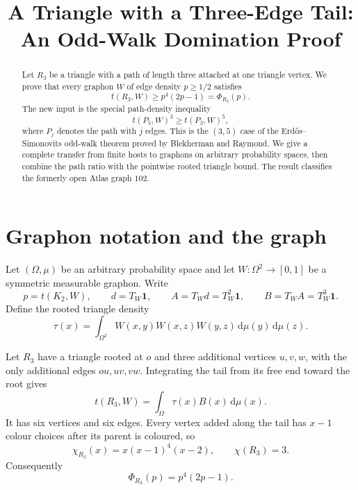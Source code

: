 \documentclass[11pt]{article}
\title{A Triangle with a Three-Edge Tail:\\
An Odd-Walk Domination Proof}
\author{}
\date{}
\newcommand{\dd}{\,\mathrm d}
\begin{document}
\maketitle

\begin{abstract}
Let $R_3$ be a triangle with a path of length three attached at one triangle
vertex.  We prove that every graphon $W$ of edge density $p\geq1/2$ satisfies
\[
 t(R_3,W)\geq p^4(2p-1)=\Phi_{R_3}(p).
\]
The new input is the special path-density inequality
\[
 t(P_5,W)^3\geq t(P_3,W)^5,
\]
where $P_j$ denotes the path with $j$ edges.  This is the $(3,5)$ case of
the Erd\H{o}s--Simonovits odd-walk theorem proved by Blekherman and Raymond.
We give a complete transfer from finite hosts to graphons on arbitrary
probability spaces, then combine the path ratio with the pointwise rooted
triangle bound.  The result classifies the formerly open Atlas graph $102$.
\end{abstract}


\section{Graphon notation and the graph}

Let $(\Omega,\mu)$ be an arbitrary probability space and let
$W\colon\Omega^2\to[0,1]$ be a symmetric measurable graphon.  Write
\[
 p=t(K_2,W),\qquad
 d=T_W\mathbf1,\qquad
 A=T_Wd=T_W^2\mathbf1,\qquad
 B=T_WA=T_W^3\mathbf1.
\]
Define the rooted triangle density
\[
 \tau(x)=\int_{\Omega^2}
 W(x,y)W(x,z)W(y,z)\dd\mu(y)\dd\mu(z).
\]

Let $R_3$ have a triangle rooted at $o$ and three additional vertices
$u,v,w$, with the only additional edges $ou,uv,vw$.  Integrating the tail
from its free end toward the root gives
\begin{equation}
 t(R_3,W)=\int_\Omega\tau(x)B(x)\dd\mu(x).
 \label{eq:R3-density}
\end{equation}
It has six vertices and six edges.  Every vertex added along the tail has
$x-1$ colour choices after its parent is coloured, so
\[
 \chi_{R_3}(x)=x(x-1)^4(x-2),
 \qquad \chi(R_3)=3.
\]
Consequently
\begin{equation}
 \Phi_{R_3}(p)=p^4(2p-1).
 \label{eq:R3-target}
\end{equation}


\end{document}
